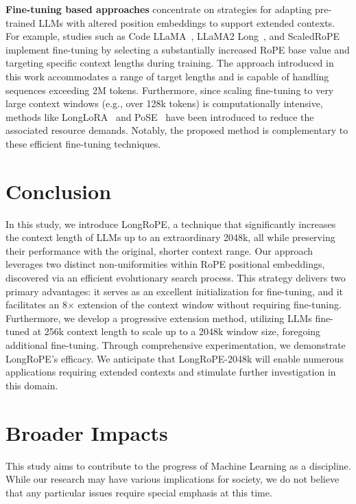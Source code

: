 \textbf{Fine-tuning based approaches} concentrate on strategies for adapting pre-trained LLMs with altered position embeddings to support extended contexts. For example, studies such as Code LLaMA~\cite{codellama}, LLaMA2 Long~\cite{xiong2023effective}, and ScaledRoPE~\cite{liu2023scaling} implement fine-tuning by selecting a substantially increased RoPE base value and targeting specific context lengths during training. The approach introduced in this work accommodates a range of target lengths and is capable of handling sequences exceeding 2M tokens. Furthermore, since scaling fine-tuning to very large context windows (e.g., over 128k tokens) is computationally intensive, methods like LongLoRA~\cite{longlora} and PoSE~\cite{zhu2023pose} have been introduced to reduce the associated resource demands. Notably, the proposed method is complementary to these efficient fine-tuning techniques.

\section{Conclusion}

In this study, we introduce LongRoPE, a technique that significantly increases the context length of LLMs up to an extraordinary 2048k, all while preserving their performance with the original, shorter context range. Our approach leverages two distinct non-uniformities within RoPE positional embeddings, discovered via an efficient evolutionary search process. This strategy delivers two primary advantages: it serves as an excellent initialization for fine-tuning, and it facilitates an 8$\times$ extension of the context window without requiring fine-tuning. Furthermore, we develop a progressive extension method, utilizing LLMs fine-tuned at 256k context length to scale up to a 2048k window size, foregoing additional fine-tuning. Through comprehensive experimentation, we demonstrate LongRoPE's efficacy. We anticipate that LongRoPE-2048k will enable numerous applications requiring extended contexts and stimulate further investigation in this domain.

\section*{Broader Impacts} This study aims to contribute to the progress of Machine Learning as a discipline. While our research may have various implications for society, we do not believe that any particular issues require special emphasis at this time.

	\balance

